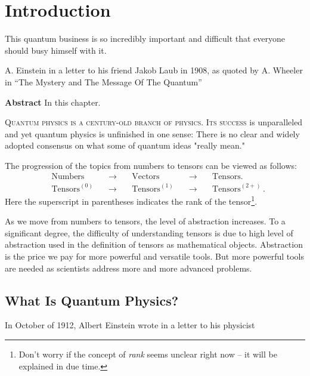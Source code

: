 \graphicspath{{../01Introduction/pics/}}

\chapter{Introduction}\label{ch:Introduction}

\begin{quoting}
	This quantum business is so incredibly important and difficult that everyone should busy himself with it. 
	
	
	A. Einstein in a letter to his friend Jakob Laub in 1908, as quoted by A. Wheeler in “The Mystery and The Message Of The Quantum”
\end{quoting}

{\bf Abstract}\hspace{0.2cm} In this chapter.


\lettrine[lines=2]{\color{darkocre}Q}{uantum physics is a century-old branch of physics. Its success} is unparalleled and yet quantum physics is unfinished in one sense: There is no clear and widely adopted consensus on what some of quantum ideas "really mean."

The progression of the topics from
numbers to tensors can be viewed as follows:
\begin{align*}
  & \textrm{Numbers} \quad & \rightarrow \quad & \textrm{Vectors} \quad &
  \rightarrow \quad & \textrm{Tensors.}\\
  & \textrm{Tensors}^{(0)} \quad & \rightarrow  \quad & \textrm{Tensors}^{(1)}
  \quad & \rightarrow \quad & \textrm{Tensors}^{(2+)}\,.
\end{align*}
Here the superscript in parentheses indicates the rank of the
tensor\footnote{Don't worry if the concept of \emph{rank} seems
unclear right now -- it will be explained in due time.}.

As we move from numbers to tensors, the level of abstraction
increases. To a significant degree, the difficulty of understanding
tensors is due to high level of abstraction used in the definition
of tensors as mathematical objects. Abstraction is the price we pay
for more powerful and versatile tools. But more powerful tools are
needed as scientists address more and more advanced problems.

\section{What Is Quantum Physics?}
In October of 1912, Albert Einstein wrote in a letter to his physicist

